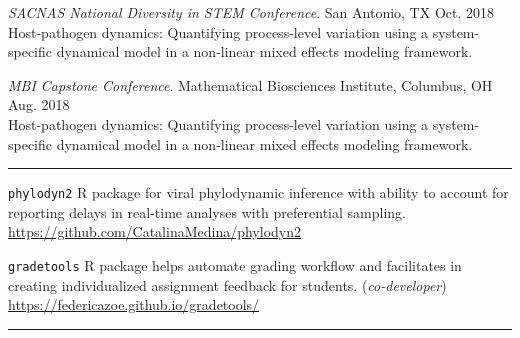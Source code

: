 \documentclass{article}
\begin{document}
\begin{description}
		\textit{SACNAS National Diversity in STEM Conference}. San Antonio, TX \hfill{Oct. 2018}\\
		Host-pathogen dynamics: Quantifying process-level variation using a system-specific dynamical model in a non-linear mixed effects modeling framework.
		\vspace*{1mm}
		
		\textit{MBI Capstone Conference}. Mathematical Biosciences Institute, Columbus, OH \hfill{Aug. 2018}\\
		Host-pathogen dynamics: Quantifying process-level variation using a system-specific dynamical model in a non-linear mixed effects modeling framework.
		\vspace*{1mm}
		
		\setlength{\leftskip}{0cm}
		
		
		
		
	\end{description}
	\vspace{-2mm}
	\rule{\linewidth}{1pt}
	
	
	\vspace*{2mm}
	
	\begin{description}
		\vspace{-2mm}
		\item[Software Developed]\hspace*{.1in}
		
		\texttt{phylodyn2} R package for viral phylodynamic inference with ability to account for reporting delays in real-time analyses with preferential sampling. \url{https://github.com/CatalinaMedina/phylodyn2}
		
		\texttt{gradetools} R package helps automate grading workflow and facilitates in creating individualized assignment feedback for students. (\textit{co-developer}) \url{https://federicazoe.github.io/gradetools/}
		
	\end{description}
	\vspace{-2mm}
	\rule{\linewidth}{1pt}
	
	
	
\end{document}
